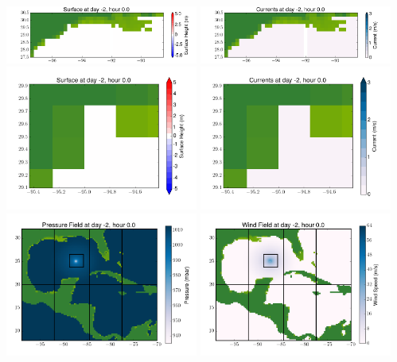 \documentclass[11pt]{article}
\begin{document}
\includegraphics[width=0.475\textwidth]{frame0024fig4.png}
\vskip 10pt 
\includegraphics[width=0.475\textwidth]{frame0024fig5.png}
\includegraphics[width=0.475\textwidth]{frame0024fig6.png}
\vskip 10pt 
\includegraphics[width=0.475\textwidth]{frame0024fig7.png}
\includegraphics[width=0.475\textwidth]{frame0024fig8.png}
\vskip 10pt 
\includegraphics[width=0.475\textwidth]{frame0024fig9.png}
\end{document}
